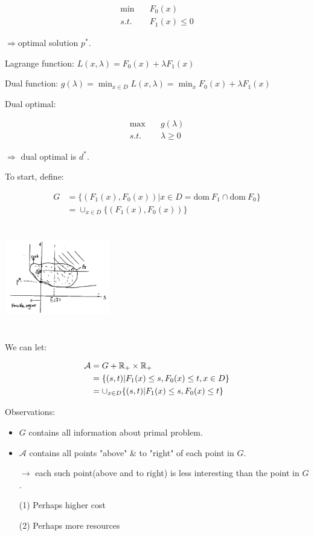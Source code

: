\begin{align*}
	\min \quad & F_0(x)\\
	s.t. \quad & F_1(x) \leq 0
\end{align*}

$\Rightarrow$optimal solution $p^*$.

Lagrange function: $L(x, \lambda) = F_0(x) + \lambda F_1(x)$

Dual function: $g(\lambda) = \min_{x\in D} L(x,\lambda) = \min_x{F_0(x) + \lambda F_1(x)}$

Dual optimal: 

\begin{align*}
	\max \quad & g(\lambda)\\
	s.t. \quad & \lambda  \geq 0
\end{align*}

$\Rightarrow$ dual optimal is $d^*$.

To start, define:

\begin{align*}
	G 
	&= \{(F_1(x), F_0(x)) \vert x\in D = \text{dom}\ F_1\cap \text{dom}\ F_0 \}\\
	&= \cup_{x\in D}\{(F_1(x), F_0(x)) \}
\end{align*}

\begin{marginfigure}
	\centering
	\includegraphics[width=1.8in,height=1.8in]{figures/ch10/figure1125_2.png}
\end{marginfigure}

We can let:

\begin{align*}
	\mathcal{A} &= G + \mathbb{R}_+ \times \mathbb{R}_+\\
	&= \{(s,t) \vert F_1(x)\leq s, F_0(x)\leq t, x\in D \}\\
	&= \cup_{x\in D}\{(s,t)\vert F_1(x)\leq s, F_0(x)\leq t \}
\end{align*}

Observations: 

\begin{itemize}
	\item $G$ contains all information about primal problem.
	
	\item $\mathcal{A}$ contains all points "above" \& to "right" of each point in $G$.
	
	$\rightarrow$ each such point(above and to right) is less interesting than the point in $G$.
	
	(1) Perhaps higher cost
	
	(2) Perhaps more resources
\end{itemize}

